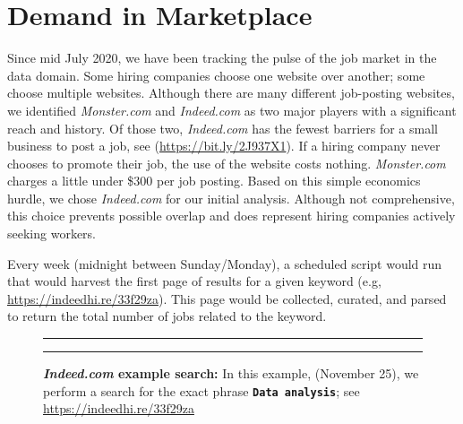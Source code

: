 \documentclass[]{article}
\begin{document}
\newpage
\section{ Demand in Marketplace}
\label{sec:dm}

Since mid July 2020, we have been tracking the pulse of the job market
in the data domain. Some hiring companies choose one website over
another; some choose multiple websites. Although there are many
different job-posting websites, we identified \emph{Monster.com} and
\emph{Indeed.com} as two major players with a significant reach and
history. Of those two, \emph{Indeed.com} has the fewest barriers for a
small business to post a job, see (\url{https://bit.ly/2J937X1}). If a
hiring company never chooses to promote their job, the use of the
website costs nothing. \emph{Monster.com} charges a little under \$300
per job posting. Based on this simple economics hurdle, we chose
\emph{Indeed.com} for our initial analysis. Although not comprehensive,
this choice prevents possible overlap and does represent hiring
companies actively seeking workers.

Every week (midnight between Sunday/Monday), a scheduled script would
run that would harvest the first page of results for a given keyword
(e.g, \url{https://indeedhi.re/33f29za}). This page would be collected,
curated, and parsed to return the total number of jobs related to the
keyword.

\begin{figure}[!ht]
    \label{fig:indeed-search}
    \begin{center}
    \end{center}
        \hrule
        \vspace{2mm}
    \caption{ \textbf{\emph{Indeed.com} example search:} \newline \footnotesize { In this example, (November 25), we perform a search for the exact phrase \textbf{\tt{Data analysis}}; see \url{https://indeedhi.re/33f29za}  }  }
    \vspace{2mm}
    \hrule
\end{figure}
\end{document}
